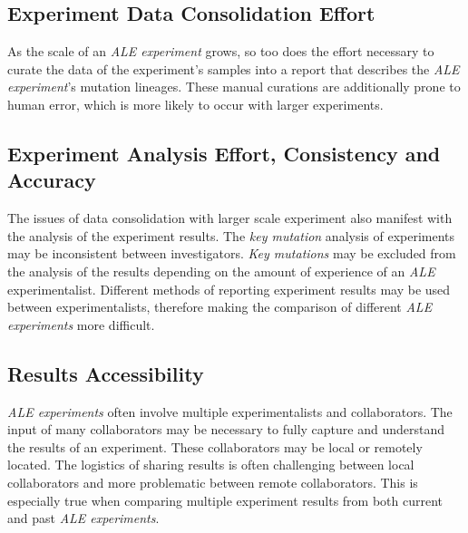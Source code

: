 \documentclass[12pt,final,masters,chapterheads]{ucsd}  %
\begin{document}

\subsection{Experiment Data Consolidation Effort}

As the scale of an \textit{ALE experiment} grows, so too does the effort necessary to curate the data of the experiment's samples into a report that describes the \textit{ALE experiment}'s mutation lineages. These manual curations are additionally prone to human error, which is more likely to occur with larger experiments.

\subsection{Experiment Analysis Effort, Consistency and Accuracy}

The issues of data consolidation with larger scale experiment also manifest with the analysis of the experiment results. The \textit{key mutation} analysis of experiments may be inconsistent between investigators. \textit{Key mutations} may be excluded from the analysis of the results depending on the amount of experience of an \textit{ALE} experimentalist. Different methods of reporting experiment results may be used between experimentalists, therefore making the comparison of different \textit{ALE experiments} more difficult.

\subsection{Results Accessibility}

%
%

\textit{ALE experiments} often involve multiple experimentalists and collaborators. The input of many collaborators may be necessary to fully capture and understand the results of an experiment. These collaborators may be local or remotely located. The logistics of sharing results is often challenging between local collaborators and more problematic between remote collaborators. This is especially true when comparing multiple experiment results from both current and past \textit{ALE experiments}.
\end{document}
